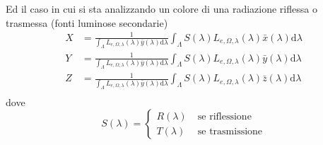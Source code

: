 Ed il caso in cui si sta analizzando un colore di una radiazione riflessa o trasmessa (fonti luminose secondarie)
\begin{align}
	X &= \frac{1}{\int_\Lambda L_{e,\Omega,\lambda}(\lambda)\bar{y}(\lambda)\mathrm{d}\lambda}
		\int_\Lambda S(\lambda)L_{e,\Omega,\lambda}(\lambda)\bar{x}(\lambda)\mathrm{d}\lambda\\
	Y &= \frac{1}{\int_\Lambda L_{e,\Omega,\lambda}(\lambda)\bar{y}(\lambda)\mathrm{d}\lambda}
		\int_\Lambda S(\lambda)L_{e,\Omega,\lambda}(\lambda)\bar{y}(\lambda)\mathrm{d}\lambda\\
	Z &= \frac{1}{\int_\Lambda L_{e,\Omega,\lambda}(\lambda)\bar{y}(\lambda)\mathrm{d}\lambda}
		\int_\Lambda S(\lambda)L_{e,\Omega,\lambda}(\lambda)\bar{z}(\lambda)\mathrm{d}\lambda\\
\end{align}
dove
\begin{equation}
	S(\lambda) = \left\{ \begin{aligned}
		R(\lambda)\;&\text{se riflessione}\\
		T(\lambda)\;&\text{se trasmissione}
	\end{aligned}\right.
\end{equation}
